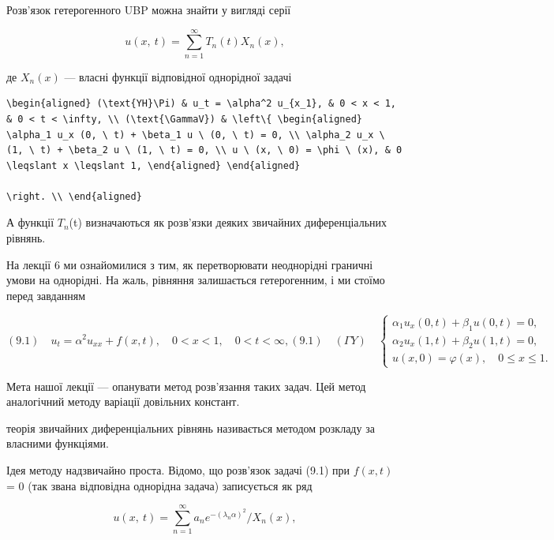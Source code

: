 \documentclass[
  ukrainian,
]{article}
\begin{document}
Розв'язок гетерогенного UBP можна знайти у вигляді серії

\[
u\left( x,\ t\right) =\sum_{n=1}^{\infty}T_{n}\left( t\right) X_{n}\left( x\right) ,
\]

де \(X_n\left(x\right)\) --- власні функції відповідної однорідної
задачі

\begin{verbatim}
\begin{aligned} (\text{YH}\Pi) & u_t = \alpha^2 u_{x_1}, & 0 < x < 1, & 0 < t < \infty, \\ (\text{\GammaV}) & \left\{ \begin{aligned} \alpha_1 u_x (0, \ t) + \beta_1 u \ (0, \ t) = 0, \\ \alpha_2 u_x \ (1, \ t) + \beta_2 u \ (1, \ t) = 0, \\ u \ (x, \ 0) = \phi \ (x), & 0 \leqslant x \leqslant 1, \end{aligned} \end{aligned}

\right. \\ \end{aligned}
\end{verbatim}

А функції \(T_n\)(t) визначаються як розв'язки деяких звичайних
диференціальних рівнянь.

На лекції 6 ми ознайомилися з тим, як перетворювати неоднорідні граничні
умови на однорідні. На жаль, рівняння залишається гетерогенним, і ми
стоїмо перед завданням

\[
(9.1) \quad u_{t} = \alpha^{2} u_{xx} + f(x, t), \quad 0 < x < 1, \quad 0 < t < \infty,
(9.1) \quad (\Gamma Y) \quad
\begin{cases} \alpha_{1} u_{x}(0, t) + \beta_{1} u(0, t) = 0, \\ \alpha_{2} u_{x}(1, t) + \beta_{2} u(1, t) = 0, \\ u(x, 0) = \varphi(x), \quad 0 \le x \le 1. \end{cases}
\]

Мета нашої лекції --- опанувати метод розв'язання таких задач. Цей метод
аналогічний методу варіації довільних констант.

теорія звичайних диференціальних рівнянь називається методом розкладу за
власними функціями.

Ідея методу надзвичайно проста. Відомо, що розв'язок задачі (9.1) при
\(f(x, t)\) = 0 (так звана відповідна однорідна задача) записується як
ряд

\[
u\left(x,\ t\right)=\sum_{n=1}^{\infty}a_{n}e^{-\left(\lambda_{n}\alpha\right)^{2}}/X_{n}\left(x\right),
\]
\end{document}

